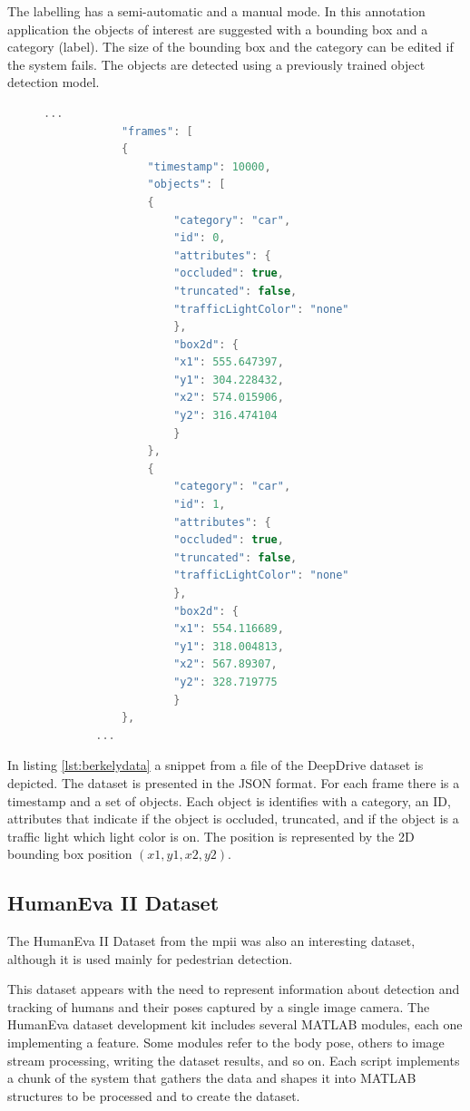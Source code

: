 The labelling has a semi-automatic and a manual mode. In this annotation application the objects of interest are suggested with a bounding box and a category (label). The size of the bounding box and the category can be edited if the system fails. The objects are detected using a previously trained object detection model. 

\begin{figure}
	\begin{center}
		\begin{lstlisting}[label={lst:berkelydata}, caption={DeepDrive dataset file snippet.},language=C++]
		...
		    "frames": [
		    {
			    "timestamp": 10000,
			    "objects": [
			    {
				    "category": "car",
				    "id": 0,
				    "attributes": {
				    "occluded": true,
				    "truncated": false,
				    "trafficLightColor": "none"
				    },
				    "box2d": {
				    "x1": 555.647397,
				    "y1": 304.228432,
				    "x2": 574.015906,
				    "y2": 316.474104
				    }
			    },
			    {
				    "category": "car",
				    "id": 1,
				    "attributes": {
				    "occluded": true,
				    "truncated": false,
				    "trafficLightColor": "none"
				    },
				    "box2d": {
				    "x1": 554.116689,
				    "y1": 318.004813,
				    "x2": 567.89307,
				    "y2": 328.719775
				    }
		    },
		...	\end{lstlisting}
	\end{center}
\end{figure}

In listing \ref{lst:berkelydata} a snippet from a file of the DeepDrive dataset is depicted. The dataset is presented in the JSON format. For each frame there is a timestamp and a set of objects. Each object is identifies with a category, an ID, attributes that indicate if the object is occluded, truncated, and if the object is a traffic light which light color is on. The position is represented by the 2D bounding box position $(x1,y1,x2,y2)$.

	
\subsection{HumanEva II Dataset}
The HumanEva II Dataset from the \gls{mpii} was also an interesting dataset, although it is used mainly for pedestrian detection.

This dataset appears with the need to represent information about detection and tracking of humans and their poses captured by a single image camera. The HumanEva dataset development kit includes several MATLAB modules, each one implementing a feature. Some modules refer to the body pose, others to image stream processing, writing the dataset results, and so on. Each script implements a chunk of the system that gathers the data and shapes it into MATLAB structures to be processed and to create the dataset.

